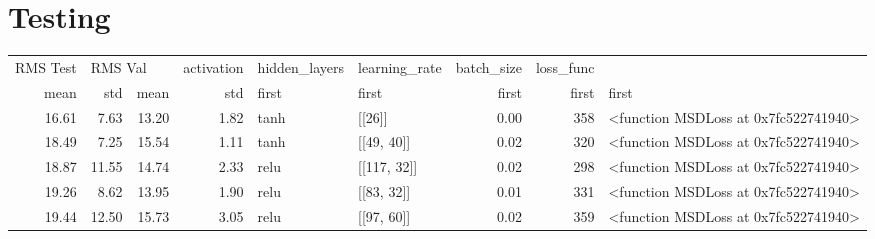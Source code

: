 \section{Testing}
\begin{tabular}{rrrrllrrl}
    \toprule
    RMS Test & \multicolumn{2}{l}{RMS Val} & activation & hidden\_layers & learning\_rate & batch\_size &                            loss\_func \\
        mean &   std &    mean &  std &      first &         first &         first &      first &                                first \\
       16.61 &  7.63 &   13.20 & 1.82 &       tanh &        [[26]] &          0.00 &        358 & <function MSDLoss at 0x7fc522741940> \\
    \midrule
       18.49 &  7.25 &   15.54 & 1.11 &       tanh &    [[49, 40]] &          0.02 &        320 & <function MSDLoss at 0x7fc522741940> \\
       18.87 & 11.55 &   14.74 & 2.33 &       relu &   [[117, 32]] &          0.02 &        298 & <function MSDLoss at 0x7fc522741940> \\
       19.26 &  8.62 &   13.95 & 1.90 &       relu &    [[83, 32]] &          0.01 &        331 & <function MSDLoss at 0x7fc522741940> \\
       19.44 & 12.50 &   15.73 & 3.05 &       relu &    [[97, 60]] &          0.02 &        359 & <function MSDLoss at 0x7fc522741940> \\
    \bottomrule
    \end{tabular}
    
